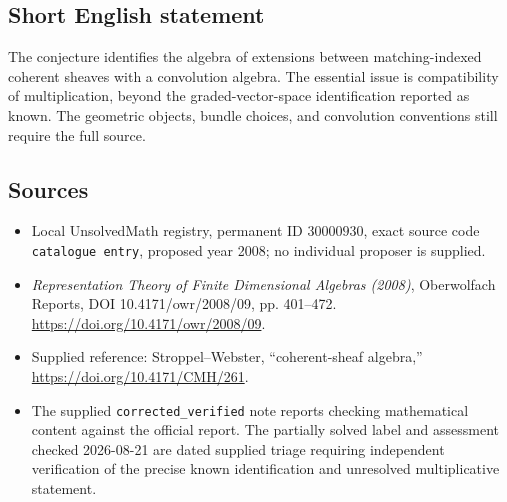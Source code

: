 \documentclass[11pt]{article}
\begin{document}
\subsection{Short English statement}
The conjecture identifies the algebra of extensions between matching-indexed coherent sheaves with a convolution algebra. The essential issue is compatibility of multiplication, beyond the graded-vector-space identification reported as known. The geometric objects, bundle choices, and convolution conventions still require the full source.
\subsection{Sources}
\begin{itemize}
\item Local UnsolvedMath registry, permanent ID \(30000930\), exact source code \texttt{catalogue entry}, proposed year 2008; no individual proposer is supplied.
\item \emph{Representation Theory of Finite Dimensional Algebras (2008)}, Oberwolfach Reports, DOI 10.4171/owr/2008/09, pp. 401--472. \url{https://doi.org/10.4171/owr/2008/09}.
\item Supplied reference: Stroppel--Webster, ``coherent-sheaf algebra,'' \url{https://doi.org/10.4171/CMH/261}.
\item The supplied \texttt{corrected\_verified} note reports checking mathematical content against the official report. The partially solved label and assessment checked 2026-08-21 are dated supplied triage requiring independent verification of the precise known identification and unresolved multiplicative statement.
\end{itemize}
\end{document}

